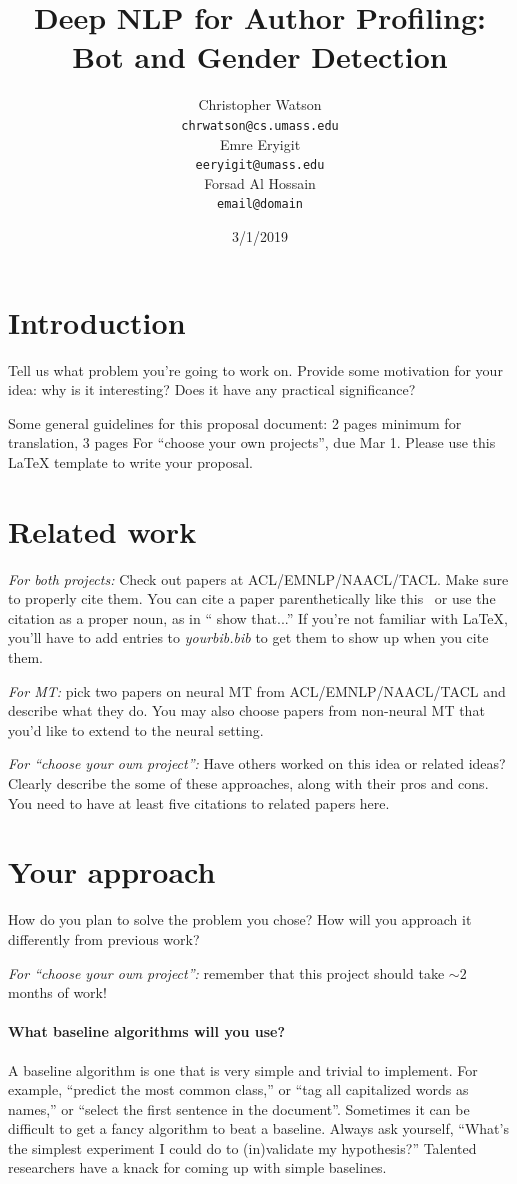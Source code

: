 \documentclass[11pt,a4paper]{article}
\title{Deep NLP for Author Profiling: Bot and Gender Detection}
\author{Christopher Watson \\
  {\tt chrwatson@cs.umass.edu} \\\And
  Emre Eryigit \\
  {\tt eeryigit@umass.edu} \\\And
  Forsad Al Hossain\\
  {\tt email@domain} \\}
\date{3/1/2019}
\begin{document}
\maketitle

\section{Introduction}
Tell us what problem you're going to work on. Provide some motivation for your idea: why is it interesting? Does it have any practical significance? 

Some general guidelines for this proposal document: 2 pages minimum for translation, 3 pages For ``choose your own projects'', due Mar 1. Please use this LaTeX template to write your proposal.

\section{Related work}

\noindent\textit{For both projects:} 
Check out papers at ACL/EMNLP/NAACL/TACL. Make sure to properly cite them. You can cite a paper parenthetically like this~\cite{andrew2007scalable} or use the citation as a proper noun, as in `` show that...'' If you're not familiar with LaTeX, you'll have to add entries to \emph{yourbib.bib} to get them to show up when you cite them. 

\noindent\textit{For MT:} pick two papers on neural MT from ACL/EMNLP/NAACL/TACL and describe what they do. You may also choose papers from non-neural MT that you'd like to  extend to the neural setting.

\noindent\textit{For ``choose your own project'':}
Have others worked on this idea or related ideas? Clearly describe the some of these approaches, along with their pros and cons. You need to have at least five citations to related papers here. 

\section{Your approach}
How do you plan to solve the problem you chose? How will you approach it differently from previous work?

\noindent\textit{For ``choose your own project'':} remember that this project should take $\sim 2$ months of work! 

\paragraph{What baseline algorithms will you use?}
A baseline algorithm is one that is very simple and trivial to implement. For example, ``predict the most common class,'' or ``tag all capitalized words as names,'' or ``select the first sentence in the document''. Sometimes it can be difficult to get a fancy algorithm to beat a baseline. Always ask yourself, ``What's the simplest experiment I could do to (in)validate my hypothesis?'' Talented researchers have a knack for coming up with simple baselines.
\end{document}
